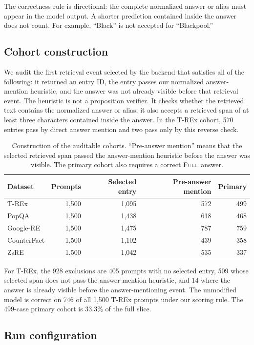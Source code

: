 \documentclass[11pt]{article}
\newcommand{\FULL}{\textsc{Full}}
\newcommand{\pct}[1]{#1\%}
\begin{document}
The correctness rule is directional: the complete normalized answer or alias
must appear in the model output. A shorter prediction contained inside the
answer does not count. For example, ``Black'' is not accepted for
``Blackpool.''

\subsection{Cohort construction}

We audit the first retrieval event selected by the backend that satisfies all
of the following: it returned an entry ID, the entry passes our normalized
answer-mention heuristic, and the answer was not already visible before that
retrieval event. The heuristic is not a proposition verifier. It checks
whether the retrieved text contains the normalized answer or alias; it also
accepts a retrieved span of at least three characters contained inside the
answer. In the T-REx cohort, 570 entries pass by direct answer mention and two
pass only by this reverse check.

\begin{table}[H]
\centering
\caption{Construction of the auditable cohorts. ``Pre-answer mention'' means
that the selected retrieved span passed the answer-mention heuristic before
the answer was visible. The primary cohort also requires a correct \FULL\
answer.}
\label{tab:coverage}
\small
\begin{tabular}{lrrrr}
\toprule
Dataset & Prompts & Selected entry & Pre-answer mention & Primary \\
\midrule
T-REx & 1,500 & 1,095 & 572 & 499 \\
PopQA & 1,500 & 1,438 & 618 & 468 \\
Google-RE & 1,500 & 1,475 & 787 & 759 \\
CounterFact & 1,500 & 1,102 & 439 & 358 \\
ZsRE & 1,500 & 1,042 & 535 & 337 \\
\bottomrule
\end{tabular}
\end{table}

For T-REx, the 928 exclusions are 405 prompts with no selected entry, 509
whose selected span does not pass the answer-mention heuristic, and 14 where
the answer is already visible before the answer-mentioning event. The
unmodified model is correct on 746 of all 1,500 T-REx prompts under our
scoring rule. The 499-case primary cohort is \pct{33.3} of the full slice.

\subsection{Run configuration}
\end{document}
